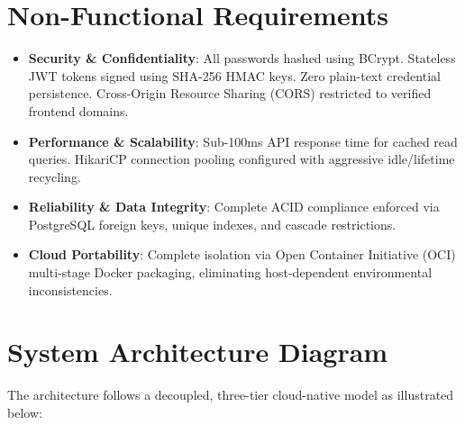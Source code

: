 \documentclass[12pt,a4paper,oneside]{report}
\begin{document}
\section{Non-Functional Requirements}
\begin{itemize}
    \item \textbf{Security \& Confidentiality}: All passwords hashed using BCrypt. Stateless JWT tokens signed using SHA-256 HMAC keys. Zero plain-text credential persistence. Cross-Origin Resource Sharing (CORS) restricted to verified frontend domains.
    \item \textbf{Performance \& Scalability}: Sub-100ms API response time for cached read queries. HikariCP connection pooling configured with aggressive idle/lifetime recycling.
    \item \textbf{Reliability \& Data Integrity}: Complete ACID compliance enforced via PostgreSQL foreign keys, unique indexes, and cascade restrictions.
    \item \textbf{Cloud Portability}: Complete isolation via Open Container Initiative (OCI) multi-stage Docker packaging, eliminating host-dependent environmental inconsistencies.
\end{itemize}

\section{System Architecture Diagram}
The architecture follows a decoupled, three-tier cloud-native model as illustrated below:
\end{document}
